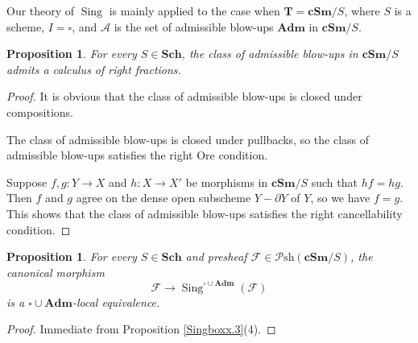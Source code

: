 \documentclass[11pt, a4paper]{amsart}
\newtheorem{prop}[thm]{Proposition}
\theoremstyle{definition}
\numberwithin{equation}{subsection}
\newcommand{\Sch}{\mathbf{Sch}}
\newcommand{\cSm}{\mathbf{cSm}}
\newcommand{\Sing}{\operatorname{Sing}}              %
\newcommand{\Adm}{\mathbf{Adm}}
\newcommand{\cA}{\mathcal{A}}
\newcommand{\cF}{\mathcal{F}}
\newcommand{\bT}{\mathbf{T}}
\newcommand{\boxx}{\square}
\newcommand{\infPsh}{\mathcal{P}\mathrm{sh}}
\begin{document}
Our theory of $\Sing$ is mainly applied to the case when $\bT=\cSm/S$, 
where $S$ is a scheme,
$I=\boxx$, and $\cA$ is the set of admissible blow-ups $\Adm$ in $\cSm/S$.

\begin{prop}
\label{Singboxx.6}
For every $S\in \Sch$, 
the class of admissible blow-ups in $\cSm/S$ admits a calculus of right fractions.
\end{prop}
\begin{proof}
It is obvious that the class of admissible blow-ups is closed under compositions.

The class of admissible blow-ups is closed under pullbacks,
so the class of admissible blow-ups satisfies the right Ore condition.

Suppose $f,g\colon Y\to X$ and $h\colon X\to X'$ be morphisms in $\cSm/S$ such that $hf=hg$.
Then $f$ and $g$ agree on the dense open subscheme $Y-\partial Y$ of $Y$,
so we have $f=g$.
This shows that the class of admissible blow-ups satisfies the right cancellability condition.
\end{proof}

\begin{prop}
\label{Singboxx.4}
For every $S\in\Sch$ and  presheaf $\cF\in \infPsh(\cSm/S)$, 
the canonical morphism
\[
\cF\to \Sing^{\boxx\cup\Adm}(\cF)
\]
is a $\boxx\cup \Adm$-local  equivalence.
\end{prop}
\begin{proof}
Immediate from Proposition \ref{Singboxx.3}(4).
\end{proof}
\end{document}

